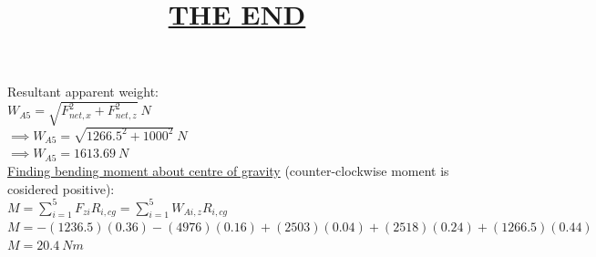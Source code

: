 \documentclass{article}
\begin{document}
\noindent Resultant apparent weight: \\
$W_{A5}= \sqrt{F_{net,x}^2+ F_{net,z}^2}\ N$\\
$\implies W_{A5}= \sqrt{1266.5^2+ 1000^2}\ N$\\
$\implies W_{A5}= 1613.69\ N$\\

\noindent \underline{Finding bending moment about centre of gravity} (counter-clockwise moment is cosidered positive):\\

\noindent $M= \sum_{i=1}^5F_{zi}R_{i,cg}= \sum_{i=1}^5W_{Ai,z}R_{i,cg}$\\
$ M=-(1236.5)(0.36)-(4976)(0.16)+(2503)(0.04)+(2518)(0.24)+(1266.5)(0.44)$ \\
$M=20.4\ Nm$\\
\bigbreak
\begin{center}
\title{\textbf{\LARGE \underline{THE END}}}
\end{center}
\end{document}
